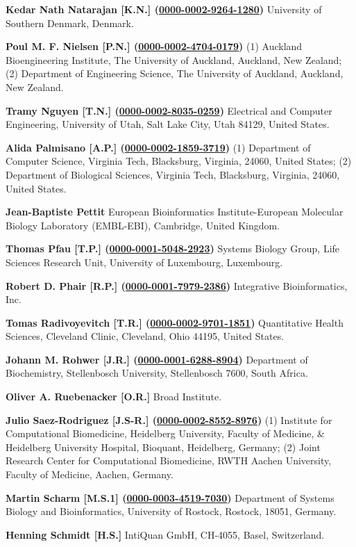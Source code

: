 \documentclass{sbml-paper}
\newcommand{\orcid}[1]{\href{https://orcid.org/#1}{#1}}
\begin{document}
\textbf{Kedar Nath Natarajan [K.N.] (\orcid{0000-0002-9264-1280})} University of Southern Denmark, Denmark.

\textbf{Poul M. F. Nielsen [P.N.] (\orcid{0000-0002-4704-0179})} (1) Auckland Bioengineering Institute, The University of Auckland, Auckland, New Zealand; (2) Department of Engineering Science, The University of Auckland, Auckland, New Zealand.

\textbf{Tramy Nguyen [T.N.] (\orcid{0000-0002-8035-0259})} Electrical and Computer Engineering, University of Utah, Salt Lake City, Utah 84129, United States.

\textbf{Alida Palmisano [A.P.] (\orcid{0000-0002-1859-3719})} (1) Department of Computer Science, Virginia Tech, Blacksburg, Virginia, 24060,  United States; (2) Department of Biological Sciences, Virginia Tech, Blacksburg, Virginia, 24060, United States.

\textbf{Jean-Baptiste Pettit} European Bioinformatics Institute-European Molecular Biology Laboratory (EMBL-EBI), Cambridge, United Kingdom.

\textbf{Thomas Pfau [T.P.] (\orcid{0000-0001-5048-2923})} Systems Biology Group, Life Sciences Research Unit, University of Luxembourg, Luxembourg.

\textbf{Robert D. Phair [R.P.] (\orcid{0000-0001-7979-2386})} Integrative Bioinformatics, Inc.

\textbf{Tomas Radivoyevitch [T.R.] (\orcid{0000-0002-9701-1851})} Quantitative Health Sciences, Cleveland Clinic, Cleveland, Ohio 44195, United States.

\textbf{Johann M. Rohwer [J.R.] (\orcid{0000-0001-6288-8904})} Department of Biochemistry, Stellenbosch University, Stellenbosch 7600, South Africa.

\textbf{Oliver A. Ruebenacker [O.R.]} Broad Institute.

\textbf{Julio Saez-Rodriguez [J.S-R.] (\orcid{0000-0002-8552-8976})} (1) Institute for Computational Biomedicine, Heidelberg University, Faculty of Medicine, \& Heidelberg University Hospital, Bioquant, Heidelberg, Germany; (2) Joint Research Center for Computational Biomedicine, RWTH Aachen University, Faculty of Medicine, Aachen, Germany.

\textbf{Martin Scharm [M.S.1] (\orcid{0000-0003-4519-7030})} Department of Systems Biology and Bioinformatics, University of Rostock, Rostock, 18051, Germany.

\textbf{Henning Schmidt [H.S.]} IntiQuan GmbH, CH-4055, Basel, Switzerland.
\end{document}

